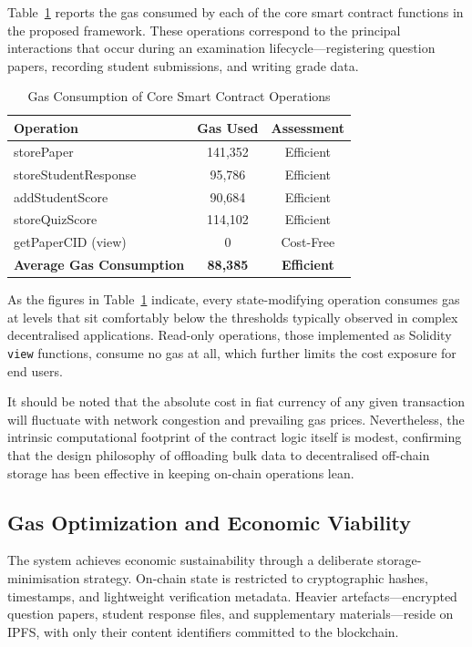 \documentclass[final,5p,times]{elsarticle}
\begin{document}
Table~\ref{tab:speed} reports the gas consumed by each of the core smart contract functions in the proposed framework. These operations correspond to the principal interactions that occur during an examination lifecycle—registering question papers, recording student submissions, and writing grade data.

\begin{table}[H]
\caption{Gas Consumption of Core Smart Contract Operations}
\label{tab:speed}
\centering
\begin{tabularx}{\linewidth}{X c c}
\toprule
\textbf{Operation} & \textbf{Gas Used} & \textbf{Assessment} \\ \midrule
storePaper & 141,352 & Efficient \\
storeStudentResponse & 95,786 & Efficient \\
addStudentScore & 90,684 & Efficient \\
storeQuizScore & 114,102 & Efficient \\
getPaperCID (view) & 0 & Cost-Free \\ \midrule
\textbf{Average Gas Consumption} & \textbf{88,385} & \textbf{Efficient} \\ \bottomrule
\end{tabularx}
\end{table}

As the figures in Table~\ref{tab:speed} indicate, every state-modifying operation consumes gas at levels that sit comfortably below the thresholds typically observed in complex decentralised applications. Read-only operations, those implemented as Solidity \texttt{view} functions, consume no gas at all, which further limits the cost exposure for end users.

It should be noted that the absolute cost in fiat currency of any given transaction will fluctuate with network congestion and prevailing gas prices. Nevertheless, the intrinsic computational footprint of the contract logic itself is modest, confirming that the design philosophy of offloading bulk data to decentralised off-chain storage has been effective in keeping on-chain operations lean.

\subsection{Gas Optimization and Economic Viability}

The system achieves economic sustainability through a deliberate storage-minimisation strategy. On-chain state is restricted to cryptographic hashes, timestamps, and lightweight verification metadata. Heavier artefacts—encrypted question papers, student response files, and supplementary materials—reside on IPFS, with only their content identifiers committed to the blockchain.
\end{document}
